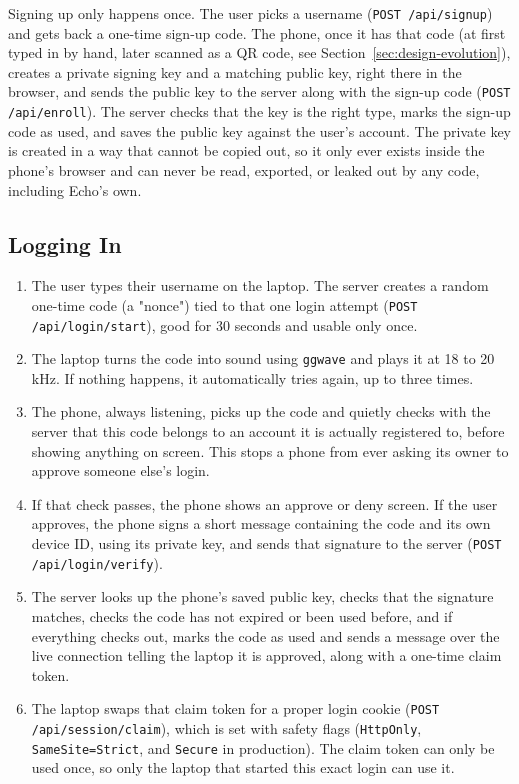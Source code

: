 Signing up only happens once. The user picks a username
(\texttt{POST /api/signup}) and gets back a one-time sign-up code. The
phone, once it has that code (at first typed in by hand, later scanned as
a QR code, see Section~\ref{sec:design-evolution}), creates a private
signing key and a matching public key, right there in the browser, and
sends the public key to the server along with the sign-up code
(\texttt{POST /api/enroll}). The server checks that the key is the right
type, marks the sign-up code as used, and saves the public key against the
user's account. The private key is created in a way that cannot be copied
out, so it only ever exists inside the phone's browser and can never be
read, exported, or leaked out by any code, including Echo's own.

\subsection{Logging In}

\begin{enumerate}[label=\arabic*.]
  \item The user types their username on the laptop. The server creates a
  random one-time code (a "nonce") tied to that one login attempt
  (\texttt{POST /api/login/start}), good for 30 seconds and usable only
  once.
  \item The laptop turns the code into sound using \texttt{ggwave} and
  plays it at 18 to 20\,kHz. If nothing happens, it automatically tries
  again, up to three times.
  \item The phone, always listening, picks up the code and quietly checks
  with the server that this code belongs to an account it is actually
  registered to, before showing anything on screen. This stops a phone
  from ever asking its owner to approve someone else's login.
  \item If that check passes, the phone shows an approve or deny screen.
  If the user approves, the phone signs a short message containing the
  code and its own device ID, using its private key, and sends that
  signature to the server (\texttt{POST /api/login/verify}).
  \item The server looks up the phone's saved public key, checks that the
  signature matches, checks the code has not expired or been used before,
  and if everything checks out, marks the code as used and sends a
  message over the live connection telling the laptop it is approved,
  along with a one-time claim token.
  \item The laptop swaps that claim token for a proper login cookie
  (\texttt{POST /api/\allowbreak session/\allowbreak claim}), which is set with safety flags
  (\texttt{HttpOnly}, \texttt{SameSite=Strict}, and \texttt{Secure} in
  production). The claim token can only be used once, so only the laptop
  that started this exact login can use it.
\end{enumerate}

